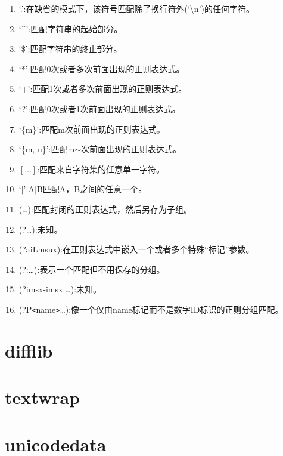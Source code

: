 \begin{enumerate}
\item \textquoteleft{.}\textquoteright{}:在缺省的模式下，该符号匹配除了换行符外(\textquoteleft{}\textbackslash{n}\textquoteright{})的任何字符。
\item \textquoteleft{}\^{}\textquoteright{}:匹配字符串的起始部分。
\item \textquoteleft{}\$\textquoteright{}:匹配字符串的终止部分。
\item \textquoteleft{}*\textquoteright{}:匹配0次或者多次前面出现的正则表达式。
\item \textquoteleft{}+\textquoteright{}:匹配1次或者多次前面出现的正则表达式。
\item \textquoteleft{}?\textquoteright{}:匹配0次或者1次前面出现的正则表达式。
\item \textquoteleft{}\{m\}\textquoteright{}:匹配m次前面出现的正则表达式。
\item \textquoteleft{}\{m, n\}\textquoteright{}:匹配m$\sim$次前面出现的正则表达式。
\item $\left[\dots\right]$:匹配来自字符集的任意单一字符。
\item \textquoteleft{}$|$\textquoteright{}:A$|$B匹配A，B之间的任意一个。
\item (\dots):匹配封闭的正则表达式，然后另存为子组。
\item (?\dots):未知。
\item (?aiLmsux):在正则表达式中嵌入一个或者多个特殊\textquotedblleft{标记}\textquotedblright{}参数。
\item (?:\dots):表示一个匹配但不用保存的分组。
\item (?imsx-imsx:\dots):未知。
\item (?P\texttt{<}name\texttt{>}\dots{}):像一个仅由name标记而不是数字ID标识的正则分组匹配。
\end{enumerate}

\section{difflib}





\section{textwrap}





\section{unicodedata}





